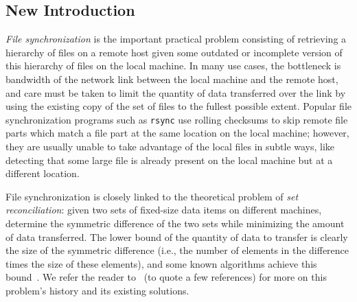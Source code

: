\documentclass[11pt]{llncs}
\newcommand{\rsync}{\texttt{rsync}\xspace}
\begin{document}
\subsection*{New Introduction}

\emph{File synchronization} is the important practical problem consisting of
retrieving a hierarchy of files on a remote host given some outdated or
incomplete version of this hierarchy of files on the local machine. In many use
cases, the bottleneck is bandwidth of the network link between the local machine
and the remote host, and care must be taken to limit the quantity of data
transferred over the link by using the existing copy of the set of files to the
fullest possible extent. Popular file synchronization programs such as \rsync
use rolling checksums to skip remote file parts which match a file part at the
same location on the local machine; however, they are usually unable to take
advantage of the local files in subtle ways, like detecting that some large file
is already present on the local machine but at a different location.

File synchronization is closely linked to the theoretical problem of \emph{set
reconciliation}: given two sets of fixed-size data items on different machines,
determine the symmetric difference of the two sets while minimizing the amount
of data transferred. The lower bound of the quantity of data to transfer is
clearly the size of the symmetric difference (i.e., the number of elements in the
difference times the size of these elements), and some known algorithms achieve
this bound~\cite{PSRec}. We refer the reader to~\cite{PSRec,Mins1,Whats} (to
quote a few references) for more on this problem's history and its existing
solutions.
\end{document}
